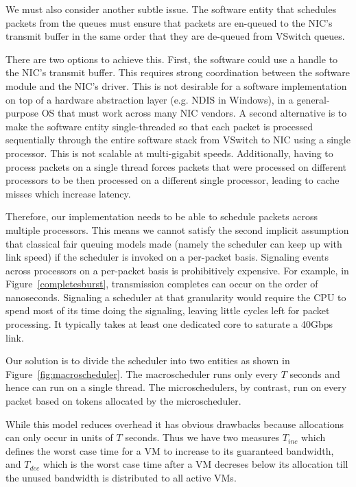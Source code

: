 We must also consider another subtle issue.  The software entity that
schedules packets from the queues must ensure that packets are en-queued to the
NIC's transmit buffer in the same order that they are de-queued from VSwitch
queues.  

There are two options to achieve this. First, the software could use a handle to
the NIC's transmit buffer.  This requires strong coordination between the
software module and the NIC's driver.  This is not desirable for a software
implementation on top of a hardware abstraction layer (e.g. NDIS in Windows), 
in a general-purpose OS that must work across many NIC vendors. A second
alternative is to make the software entity single-threaded so that each packet
is processed sequentially through the entire software stack from VSwitch to NIC
using a single processor. This is not scalable at multi-gigabit speeds.
Additionally, having to process packets on a single thread forces packets that
were processed on different processors to be then processed on a different
single processor, leading to cache misses which increase latency.  

Therefore,
our implementation needs to be able to schedule packets across multiple processors.  This
means we cannot satisfy the second implicit assumption that classical 
fair queuing models made (namely the scheduler can keep up with link speed) if the scheduler
 is invoked on a per-packet basis.  Signaling events across processors on a per-packet basis is prohibitively expensive.
For example, in Figure~\ref{completesburst}, transmission completes can occur on the order of
nanoseconds.  Signaling a scheduler at that granularity would require the CPU to spend
most of its time doing the signaling, leaving little cycles left for packet processing.  
It typically takes at least one dedicated core to saturate a 40Gbps link. 

Our solution is to divide the scheduler into two entities as shown in
Figure~\ref{fig:macroscheduler}.   The macroscheduler runs only every $T$
seconds and hence can run on a single thread.   The microschedulers, by
contrast, run on every packet based on tokens allocated by the microscheduler.   

While this model reduces overhead it has obvious drawbacks because allocations
can only occur in units of $T$ seconds.   Thus we have two measures $T_{inc}$
which defines the worst case time for a VM to increase to its guaranteed
bandwidth, and $T_{dec}$ which is the worst case time after a VM decreses below
its allocation till the unused bandwidth is distributed to all active VMs. 
